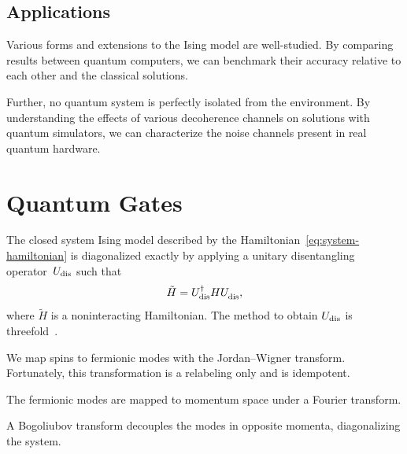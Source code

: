 \documentclass[12pt, twocolumn]{article}
\begin{document}
  \subsection*{Applications}
  Various forms and extensions to the Ising model are well-studied. By comparing results between quantum computers, we can benchmark their accuracy relative to each other and the classical solutions.

  Further, no quantum system is perfectly isolated from the environment. By understanding the effects of various decoherence channels on solutions with quantum simulators, we can characterize the noise channels present in real quantum hardware.

  \section{Quantum Gates}
  The closed system Ising model described by the Hamiltonian~\eqref{eq:system-hamiltonian} is diagonalized exactly by applying a unitary disentangling operator~\( U_{\textnormal{dis}} \) such that
  \begin{equation}
    \tilde{H}
      = U_{\textnormal{dis}}^{\dagger} H
        U_{\textnormal{dis}}^{\vphantom{\dagger}},
  \end{equation}
  where \( \tilde{H} \) is a noninteracting Hamiltonian. The method to obtain \( U_{\textnormal{dis}} \) is threefold~\cite{Verstraete2009}.
  \begin{enumerate*}[label=(\arabic*)]
    \item We map spins to fermionic modes with the Jordan--Wigner transform. Fortunately, this transformation is a relabeling only and is idempotent.
    \item The fermionic modes are mapped to momentum space under a Fourier transform.
    \item A Bogoliubov transform decouples the modes in opposite momenta, diagonalizing the system.
  \end{enumerate*}
\end{document}
